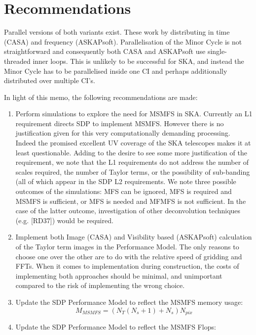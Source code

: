 \documentclass[11pt,a4paper,variablewidth]{article}
\begin{document}
\clearpage
\section{Recommendations}
\label{sec:recommendations}



Parallel versions of both variants exist. These work by distributing in time (CASA) and frequency (ASKAPsoft). Parallelisation of the Minor Cycle is not straightforward and consequently both CASA and ASKAPsoft use single-threaded inner loops. This is unlikely to be successful for SKA, and instead the Minor Cycle has to be parallelised inside one CI and perhaps additionally distributed over multiple CI's.

In light of this memo, the following recommendations are made:

\begin{enumerate}
\item Perform simulations to explore the need for MSMFS in SKA. Currently an L1 requirement directs SDP to implement MSMFS. However there is no justification given for this very computationally demanding processing. Indeed the promised excellent UV coverage of the SKA telescopes makes it at least questionable. Adding to the desire to see some more justification of the requirement, we note that the L1 requirements do not address the number of scales required, the number of Taylor terms, or the possibility of sub-banding (all of which appear in the SDP L2 requirements. We note three possible outcomes of the simulations: MFS can be ignored, MFS is required and MSMFS is sufficient, or MFS is needed and MFMFS is not sufficient. In the case of the latter outcome, investigation of other deconvolution techniques (e.g. [RD37]) would be required.
\item Implement both Image (CASA) and Visibility based (ASKAPsoft) calculation of the Taylor term images in the Performance Model. The only reasons to choose one over the other are to do with the relative speed of gridding and FFTs. When it comes to implementation during construction, the costs of implementing both approaches should be minimal, and unimportant compared to the risk of implementing the wrong choice.
\item Update the SDP Performance Model to reflect the MSMFS memory usage:
\begin{equation}
M_{MSMFS} = (N_T (N_s + 1) + N_s) N_{pix} 
\end{equation}
\item Update the SDP Performance Model to reflect the MSMFS Flops:

\end{enumerate}
\end{document}
